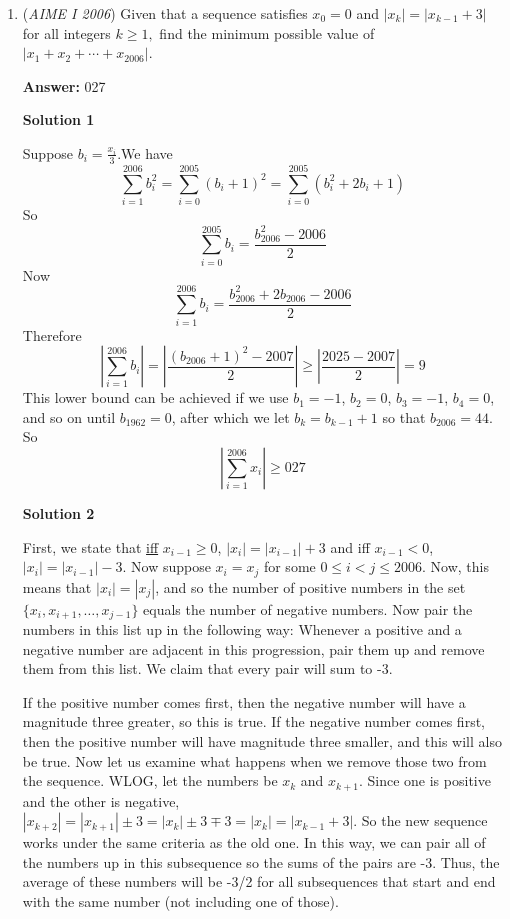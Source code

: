 \begin{enumerate}
	\item (\textit{AIME I 2006}) Given that a sequence satisfies $x_0=0$ and $|x_k|=|x_{k-1}+3|$ for all integers $k\ge 1,$ find the minimum possible value of $|x_1+x_2+\cdots+x_{2006}|.$

 \textbf{Answer: }027



\textbf{Solution 1}

Suppose $b_{i} = \frac {x_{i}}3$.We have
 \[\sum_{i = 1}^{2006}b_{i}^{2} = \sum_{i = 0}^{2005}(b_{i} + 1)^{2} = \sum_{i = 0}^{2005}(b_{i}^{2} + 2b_{i} + 1)\]So
 \[\sum_{i = 0}^{2005}b_{i} = \frac {b_{2006}^{2} - 2006}2\]Now
 \[\sum_{i = 1}^{2006}b_{i} = \frac {b_{2006}^{2} + 2b_{2006} - 2006}2\]Therefore
 \[\left|\sum_{i = 1}^{2006}b_{i}\right| = \left|\frac {(b_{2006} + 1)^{2} - 2007}2\right|\geq \left|\frac{2025 - 2007}{2}\right| = 9\]This lower bound can be achieved if we use $b_1 = -1$, $b_2 = 0$, $b_3 = -1$, $b_4 = 0$, and so on until $b_{1962} = 0$, after which we let $b_k = b_{k - 1} + 1$ so that $b_{2006} = 44$. So
 \[\left|\sum_{i = 1}^{2006}x_{i}\right|\geq \boxed{027}\]




\textbf{Solution 2}

First, we state that \href{https://artofproblemsolving.com/wiki/index.php?title=Iff}{iff} $x_{i - 1}\ge0$, $|x_i| = |x_{i - 1}| + 3$ and iff $x_{i - 1} < 0$, $|x_i| = |x_{i - 1}| - 3$. Now suppose $x_i = x_j$ for some $0\le i < j\le2006$. Now, this means that $|x_i| = |x_j|$, and so the number of positive numbers in the set $\{x_i,x_{i + 1},\ldots,x_{j - 1}\}$ equals the number of negative numbers. Now pair the numbers in this list up in the following way: Whenever a positive and a negative number are adjacent in this progression, pair them up and remove them from this list. We claim that every pair will sum to -3.

 If the positive number comes first, then the negative number will have a magnitude three greater, so this is true. If the negative number comes first, then the positive number will have magnitude three smaller, and this will also be true. Now let us examine what happens when we remove those two from the sequence. WLOG, let the numbers be $x_k$ and $x_{k + 1}$. Since one is positive and the other is negative, $|x_{k + 2}| = |x_{k + 1}|\pm3 = |x_k|\pm3\mp3 = |x_k| = |x_{k - 1} + 3|$. So the new sequence works under the same criteria as the old one. In this way, we can pair all of the numbers up in this subsequence so the sums of the pairs are -3. Thus, the average of these numbers will be -3/2 for all subsequences that start and end with the same number (not including one of those).


\end{enumerate}
